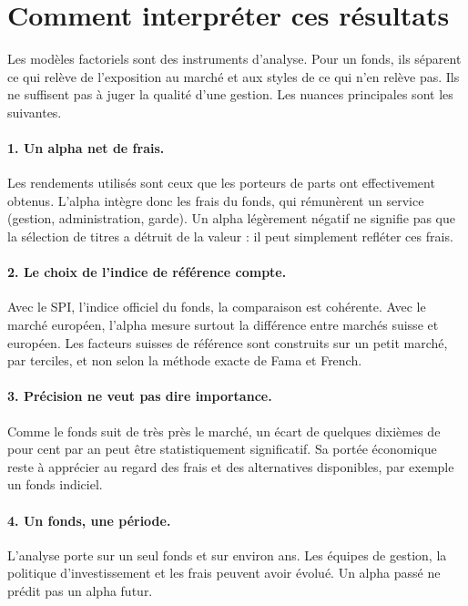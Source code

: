 \documentclass[11pt,a4paper]{article}
\begin{document}
\section{Comment interpréter ces résultats}
\label{sec:limites}

Les modèles factoriels sont des instruments d'analyse. Pour un fonds, ils séparent ce qui relève de l'exposition au marché et aux styles de ce qui n'en relève pas. Ils ne suffisent pas à juger la qualité d'une gestion. Les nuances principales sont les suivantes.

\paragraph{1. Un alpha net de frais.} Les rendements utilisés sont ceux que les porteurs de parts ont effectivement obtenus. L'alpha intègre donc les frais du fonds, qui rémunèrent un service (gestion, administration, garde). Un alpha légèrement négatif ne signifie pas que la sélection de titres a détruit de la valeur : il peut simplement refléter ces frais.

\paragraph{2. Le choix de l'indice de référence compte.} Avec le SPI, l'indice officiel du fonds, la comparaison est cohérente. Avec le marché européen, l'alpha mesure surtout la différence entre marchés suisse et européen. Les facteurs suisses de référence sont construits sur un petit marché, par terciles, et non selon la méthode exacte de Fama et French.

\paragraph{3. Précision ne veut pas dire importance.} Comme le fonds suit de très près le marché, un écart de quelques dixièmes de pour cent par an peut être statistiquement significatif. Sa portée économique reste à apprécier au regard des frais et des alternatives disponibles, par exemple un fonds indiciel.

\paragraph{4. Un fonds, une période.} L'analyse porte sur un seul fonds et sur environ \Annees{} ans. Les équipes de gestion, la politique d'investissement et les frais peuvent avoir évolué. Un alpha passé ne prédit pas un alpha futur.
\end{document}

